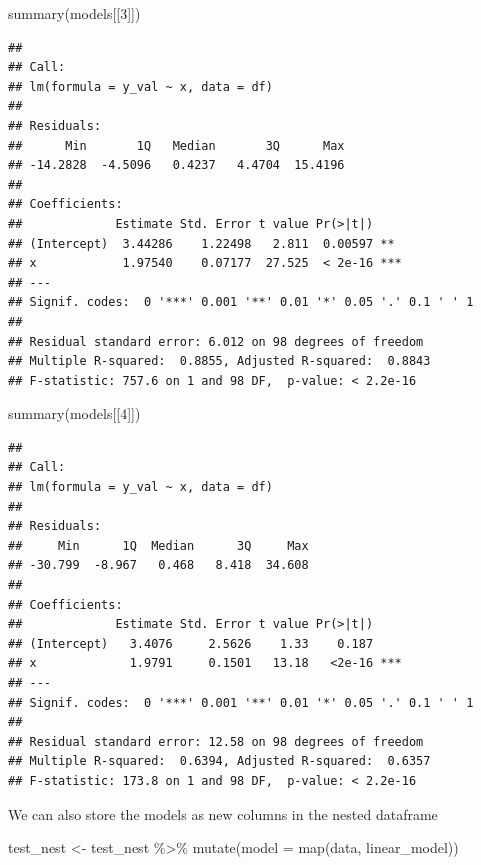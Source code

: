 \documentclass[
]{book}
\newenvironment{Shaded}{\begin{snugshade}}{\end{snugshade}}
\newcommand{\AttributeTok}[1]{\textcolor[rgb]{0.77,0.63,0.00}{#1}}
\newcommand{\DecValTok}[1]{\textcolor[rgb]{0.00,0.00,0.81}{#1}}
\newcommand{\FunctionTok}[1]{\textcolor[rgb]{0.00,0.00,0.00}{#1}}
\newcommand{\NormalTok}[1]{#1}
\newcommand{\OtherTok}[1]{\textcolor[rgb]{0.56,0.35,0.01}{#1}}
\newcommand{\SpecialCharTok}[1]{\textcolor[rgb]{0.00,0.00,0.00}{#1}}
\begin{document}
\begin{Shaded}
\begin{Highlighting}[]
\FunctionTok{summary}\NormalTok{(models[[}\DecValTok{3}\NormalTok{]])}
\end{Highlighting}
\end{Shaded}

\begin{verbatim}
## 
## Call:
## lm(formula = y_val ~ x, data = df)
## 
## Residuals:
##      Min       1Q   Median       3Q      Max 
## -14.2828  -4.5096   0.4237   4.4704  15.4196 
## 
## Coefficients:
##             Estimate Std. Error t value Pr(>|t|)    
## (Intercept)  3.44286    1.22498   2.811  0.00597 ** 
## x            1.97540    0.07177  27.525  < 2e-16 ***
## ---
## Signif. codes:  0 '***' 0.001 '**' 0.01 '*' 0.05 '.' 0.1 ' ' 1
## 
## Residual standard error: 6.012 on 98 degrees of freedom
## Multiple R-squared:  0.8855, Adjusted R-squared:  0.8843 
## F-statistic: 757.6 on 1 and 98 DF,  p-value: < 2.2e-16
\end{verbatim}

\begin{Shaded}
\begin{Highlighting}[]
\FunctionTok{summary}\NormalTok{(models[[}\DecValTok{4}\NormalTok{]])}
\end{Highlighting}
\end{Shaded}

\begin{verbatim}
## 
## Call:
## lm(formula = y_val ~ x, data = df)
## 
## Residuals:
##     Min      1Q  Median      3Q     Max 
## -30.799  -8.967   0.468   8.418  34.608 
## 
## Coefficients:
##             Estimate Std. Error t value Pr(>|t|)    
## (Intercept)   3.4076     2.5626    1.33    0.187    
## x             1.9791     0.1501   13.18   <2e-16 ***
## ---
## Signif. codes:  0 '***' 0.001 '**' 0.01 '*' 0.05 '.' 0.1 ' ' 1
## 
## Residual standard error: 12.58 on 98 degrees of freedom
## Multiple R-squared:  0.6394, Adjusted R-squared:  0.6357 
## F-statistic: 173.8 on 1 and 98 DF,  p-value: < 2.2e-16
\end{verbatim}

We can also store the models as new columns in the nested dataframe

\begin{Shaded}
\begin{Highlighting}[]
\NormalTok{test\_nest }\OtherTok{\textless{}{-}}\NormalTok{ test\_nest }\SpecialCharTok{\%\textgreater{}\%} 
  \FunctionTok{mutate}\NormalTok{(}\AttributeTok{model =} \FunctionTok{map}\NormalTok{(data, linear\_model))}
\end{Highlighting}
\end{Shaded}
\end{document}

